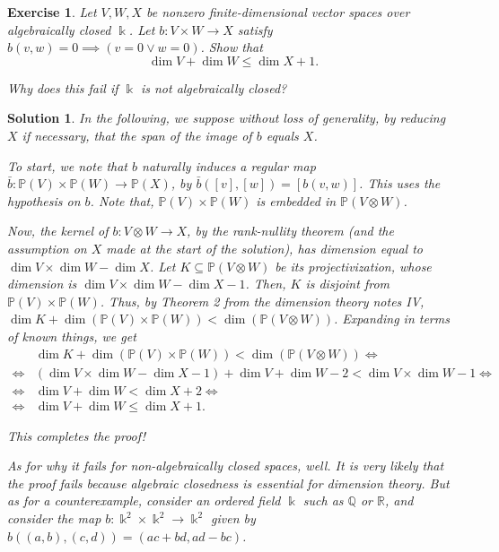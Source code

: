 \documentclass{article}
\newtheorem{ex}{Exercise}
\theoremstyle{nonumberplain}
\newtheorem{sol}{Solution}
\newcommand{\R}{\mathbb{R}}
\newcommand{\Q}{\mathbb{Q}}
\newcommand{\kk}{\Bbbk}
\newcommand{\PP}{\mathbb{P}}
\begin{document}
\begin{ex}
Let $V,W,X$ be nonzero finite-dimensional vector spaces over algebraically closed $\kk$. Let $b \colon V \times W \to X$ satisfy $b(v,w) = 0 \implies (v = 0 \lor w = 0)$. Show that
\begin{equation}
\dim V + \dim W \leq \dim X + 1.
\end{equation}

Why does this fail if $\kk$ is not algebraically closed?
\end{ex}

\begin{sol}
In the following, we suppose without loss of generality, by reducing $X$ if necessary, that the span of the image of $b$ equals $X$.

To start, we note that $b$ naturally induces a regular map $\bar b \colon \PP(V) \times \PP(W) \to \PP(X)$, by $\bar b([v],[w]) = [b(v,w)]$. This uses the hypothesis on $b$. Note that, $\PP(V) \times \PP(W)$ is embedded in $\PP(V \otimes W)$.

Now, the kernel of $b \colon V \otimes W \to X$, by the rank-nullity theorem (and the assumption on $X$ made at the start of the solution), has dimension equal to $\dim V \times \dim W - \dim X$. Let $K \subseteq \PP(V \otimes W)$ be its projectivization, whose dimension is $\dim V \times \dim W - \dim X - 1$. Then, $K$ is disjoint from $\PP(V) \times \PP(W)$. Thus, by Theorem 2 from the dimension theory notes IV, $\dim K + \dim(\PP(V) \times \PP(W)) < \dim(\PP(V \otimes W))$. Expanding in terms of known things, we get
\begin{equation}
\begin{aligned}
&\dim K + \dim(\PP(V) \times \PP(W)) < \dim(\PP(V \otimes W)) \iff\\
\iff& (\dim V \times \dim W - \dim X - 1) + \dim V + \dim W - 2 < \dim V \times \dim W - 1 \iff\\
\iff& \dim V + \dim W < \dim X + 2 \iff\\
\iff& \dim V + \dim W \leq \dim X + 1.
\end{aligned}
\end{equation}

This completes the proof!

\smallskip

As for why it fails for non-algebraically closed spaces, well. It is very likely that the proof fails because algebraic closedness is essential for dimension theory. But as for a counterexample, consider an ordered field $\kk$ such as $\Q$ or $\R$, and consider the map $b \colon \kk^2 \times \kk^2 \to \kk^2$ given by $b((a,b),(c,d)) = (ac+bd,ad-bc)$.


\end{sol}
\end{document}

